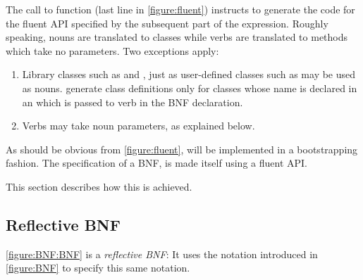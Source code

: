 The call to function  (last line in \cref{figure:fluent}) instructs
\Self to generate the code for the fluent API specified by the
subsequent part of the expression.
Roughly speaking, nouns are translated to classes while verbs are translated to methods which
take no parameters.
Two exceptions apply:
\begin{enumerate}
  \item
        Library classes such as  and , just as user-defined
        classes such as  may be used as nouns.
        \Self generate class definitions only for classes whose name is declared
        in an  which is passed to  verb in the BNF declaration.
  \item Verbs may take noun parameters, as explained below.
\end{enumerate}

As should be obvious from \cref{figure:fluent}, \Self will be implemented
in a bootstrapping fashion.
The specification of a BNF, is made itself using a fluent API.

This section describes how this is achieved.

\subsection{Reflective BNF}
\cref{figure:BNF:BNF} is a \emph{reflective BNF}:
It uses the notation introduced in \cref{figure:BNF}
to specify this same notation.

